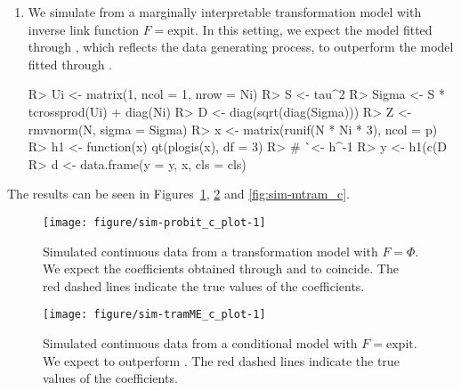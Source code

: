 \documentclass[article,nojss,shortnames]{jss}\usepackage[]{graphicx}\usepackage[]{xcolor}
\newcommand{\expit}{\text{expit}}
\newcommand{\pN}{\Phi}
\begin{document}
\begin{enumerate}
\item We simulate from a marginally interpretable transformation model with inverse link 
      function $F = \expit$. In this setting, we expect the model fitted
      through , which reflects the data generating process,
      to outperform the model fitted through .
\begin{Schunk}
\begin{Sinput}
R> Ui <- matrix(1, ncol = 1, nrow = Ni)
R> S <- tau^2
R> Sigma <- S * tcrossprod(Ui) + diag(Ni)
R> D <- diag(sqrt(diag(Sigma)))
R> Z <- rmvnorm(N, sigma = Sigma)
R> x <- matrix(runif(N * Ni * 3), ncol = p)
R> h1 <- function(x) qt(plogis(x), df = 3)
R> # ^^ <- h^{-1}
R> y <- h1(c(D %*% qlogis(pnorm(solve(D) %*% t(Z)))) + x %*% beta)
R> d <- data.frame(y = y, x, cls = cls)
\end{Sinput}
\end{Schunk}
      
\end{enumerate}

The results can be seen in Figures~\ref{fig:sim-probit_c},
\ref{fig:sim-tramME_c} and \ref{fig:sim-mtram_c}.



\begin{figure}
\begin{Schunk}


{\centering \texttt{[image: figure/sim-probit\_c\_plot-1]} 

}

\end{Schunk}
\caption{Simulated continuous data from a transformation model with $F = \pN$. 
We expect the coefficients obtained through  and  to
coincide.
The red dashed lines indicate the true values of the coefficients.
\label{fig:sim-probit_c}}
\end{figure}



\begin{figure}
\begin{Schunk}


{\centering \texttt{[image: figure/sim-tramME\_c\_plot-1]} 

}

\end{Schunk}
\caption{Simulated continuous data from a conditional model with $F = \expit$.
We expect  to outperform .
The red dashed lines indicate the true values of the coefficients.
\label{fig:sim-tramME_c}}
\end{figure}
\end{document}
